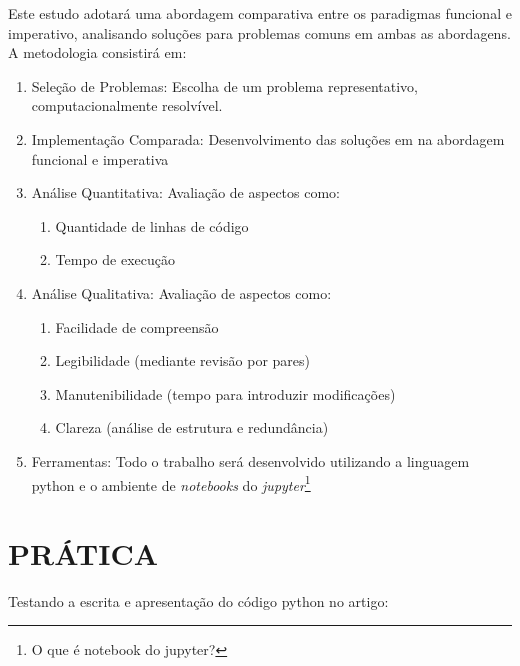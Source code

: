 \documentclass[date,twocolumn,a4paper]{ppgem}
\begin{document}
    Este estudo adotará uma abordagem comparativa entre os paradigmas funcional e imperativo, analisando soluções para problemas comuns em ambas as abordagens. A metodologia consistirá em:
    \begin{enumerate}
        \item Seleção de Problemas: Escolha de um problema representativo, computacionalmente resolvível.
        \item Implementação Comparada: Desenvolvimento das soluções em na abordagem funcional e imperativa
        \item Análise Quantitativa: Avaliação de aspectos como:
        \begin{enumerate}
            \item Quantidade de linhas de código
            \item Tempo de execução
        \end{enumerate}
        \item Análise Qualitativa: Avaliação de aspectos como:
        \begin{enumerate}
            \item Facilidade de compreensão
            \item Legibilidade (mediante revisão por pares)
            \item Manutenibilidade (tempo para introduzir modificações)
            \item Clareza (análise de estrutura e redundância)
        \end{enumerate}
        \item Ferramentas: Todo o trabalho será desenvolvido utilizando a linguagem python
            e o ambiente de \textit{notebooks} do \textit{jupyter}\footnote{O que é notebook do jupyter?}
    \end{enumerate}




    \renewcommand{\listingscaption}{Código}

    \section{PRÁTICA}

    Testando a escrita e apresentação do código python no artigo:
\end{document}
